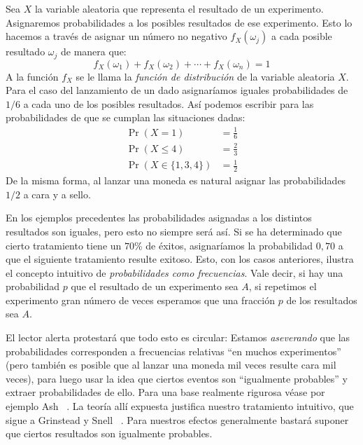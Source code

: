   Sea \(X\) la variable aleatoria
  que representa el resultado de un experimento.
  Asignaremos probabilidades
  a los posibles resultados de ese experimento.
  Esto lo hacemos a través de asignar un número no negativo
  \(f_X(\omega_j)\) a cada posible resultado \(\omega_j\)
  de manera que:
  \begin{equation}
    \label{eq:sum_probabilities=1}
    f_X(\omega_1) + f_X(\omega_2) + \dotsb + f_X(\omega_n)
      = 1
  \end{equation}
  A la función \(f_X\)
  se le llama la \emph{función de distribución}%
  de la variable aleatoria \(X\).
  Para el caso del lanzamiento de un dado
  asignaríamos iguales probabilidades de \(1 / 6\)
  a cada uno de los posibles resultados.
  Así podemos escribir para las probabilidades
  de que se cumplan las situaciones dadas:
  \begin{align*}
    \Pr(X = 1)
      &= \frac{1}{6} \\
    \Pr(X \le 4)
      &= \frac{2}{3} \\
    \Pr(X \in \{1, 3, 4\})
      &= \frac{1}{2}
  \end{align*}
  De la misma forma,
  al lanzar una moneda
  es natural asignar las probabilidades \(1 / 2\) a cara y a sello.

  En los ejemplos precedentes las probabilidades asignadas
  a los distintos resultados son iguales,
  pero esto no siempre será así.
  Si se ha determinado que cierto tratamiento
  tiene un \(70\)\% de éxitos,
  asignaríamos la probabilidad \(0,70\)
  a que el siguiente tratamiento resulte exitoso.
  Esto,
  con los casos anteriores,
  ilustra el concepto intuitivo
  de \emph{probabilidades como frecuencias}.%
  Vale decir,
  si hay una probabilidad \(p\)
  que el resultado de un experimento sea \(A\),
  si repetimos el experimento gran número de veces
  esperamos que una fracción \(p\) de los resultados sea \(A\).

  El lector alerta protestará que todo esto es circular:
  Estamos \emph{aseverando} que las probabilidades
  corresponden a frecuencias relativas ``en muchos experimentos''
  (pero también es posible que al lanzar una moneda mil veces
   resulte cara mil veces),
  para luego usar la idea
  que ciertos eventos son ``igualmente probables''
  y extraer probabilidades de ello.
  Para una base realmente rigurosa véase por ejemplo Ash~%
    \cite{ash08:_basic_probab_theo}.
  La teoría allí expuesta justifica nuestro tratamiento intuitivo,
  que sigue a Grinstead y Snell~%
    \cite{grinstead97:_introd_probab}.
  Para nuestros efectos generalmente bastará
  suponer que ciertos resultados son igualmente probables.

